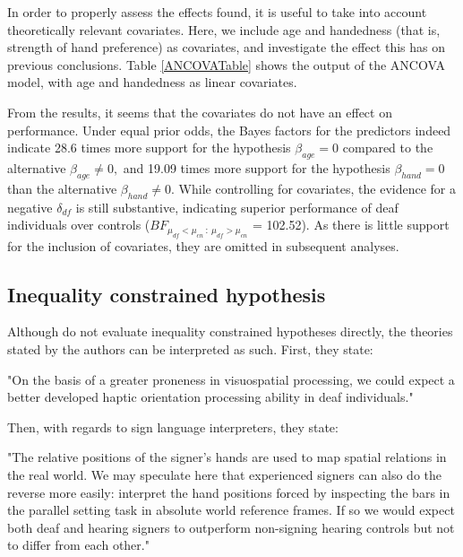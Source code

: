 \documentclass[11pt,a4paper]{article}\usepackage[]{graphicx}\usepackage[]{color}
\begin{document}
In order to properly assess the effects found, it is useful to take into account theoretically relevant covariates. Here, we include age and handedness (that is, strength of hand preference) as covariates, and investigate the effect this has on previous conclusions. Table \ref{ANCOVATable} shows the output of the ANCOVA model, with age and handedness as linear covariates.

From the results, it seems that the covariates do not have an effect on performance. Under equal prior odds, the Bayes factors for the predictors indeed indicate 28.6 times more support for the hypothesis \( \beta_{age} = 0 \) compared to the alternative \( \beta_{age} \neq 0, \) and 19.09 times more support for the hypothesis \( \beta_{hand} = 0\) than the alternative \( \beta_{hand} \neq 0.\) While controlling for covariates, the evidence for a negative \( \delta_{df}\) is still substantive, indicating superior performance of deaf individuals over controls (\(BF_{\mu_{df} < \mu_{cn} ~ : ~ \mu_{df} > \mu_{cn}} \) = 102.52). As there is little support for the inclusion of covariates, they are omitted in subsequent analyses.


\subsection{Inequality constrained hypothesis} \label{complexineq}

Although \citet{van2013superior} do not evaluate inequality constrained hypotheses directly, the theories stated by the authors can be interpreted as such. First, they state:

\begin{displayquote}
"On the basis of a greater proneness in visuospatial processing, we could expect a better developed haptic orientation processing ability in deaf individuals."
\end{displayquote}

Then, with regards to sign language interpreters, they state:

\begin{displayquote}
"The relative positions of the signer's hands are used to map spatial relations in the real world. We may speculate here that experienced signers can also do the reverse more easily: interpret the hand positions forced by inspecting the bars in the parallel setting task in absolute world reference frames. If so we would expect both deaf and hearing signers to outperform non-signing hearing controls but not to differ from each other."
\end{displayquote}
\end{document}

